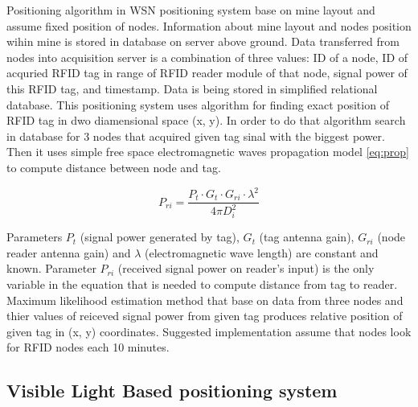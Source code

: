 \documentclass[../main.tex]{subfiles}
\begin{document}
Positioning algorithm in WSN positioning system base on mine layout and assume fixed position of nodes. Information about mine layout and nodes position wihin mine is stored in database on server above ground. Data transferred from nodes into acquisition server is a combination of three values: ID of a node, ID of acquried RFID tag in range of RFID reader module of that node, signal power of this RFID tag, and timestamp. Data is being stored in simplified relational database. This positioning system uses algorithm for finding exact position of RFID tag in dwo diamensional space (x, y). In order to do that algorithm search in database for 3 nodes that acquired given tag sinal with the biggest power. Then it uses simple free space electromagnetic waves propagation model \eqref{eq:prop} to compute distance between node and tag.

\begin{equation}
\label{eq:prop}
P_{ri}=\frac{P_t \cdot G_t \cdot G_{ri} \cdot \lambda^2}{4\pi D_i^2}
\end{equation}

Parameters $P_t$ (signal power generated by tag), $G_t$ (tag antenna gain), $G_{ri}$ (node reader antenna gain) and $\lambda$ (electromagnetic wave length) are constant and known. Parameter ${P_{ri}}$ (received signal power on reader's input) is the only variable in the equation that is needed to compute distance from tag to reader. Maximum likelihood estimation method that base on data from three nodes and thier values of reiceved signal power from given tag produces relative position of given tag in (x, y) coordinates. Suggested implementation \cite{WSN_tracking} assume that nodes look for RFID nodes each 10 minutes.


\subsection{Visible Light Based positioning system} %
\label{sub:visible_light_based_positioning_system}
\end{document}
